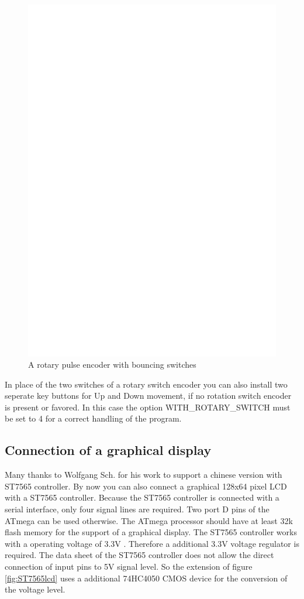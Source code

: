 \begin{figure}[H]
\centering
\includegraphics[width=14cm]{../FIG/rotary_bouncing.eps}
\caption{A rotary pulse encoder with bouncing switches}
\label{fig:RotBounce}
\end{figure}

In place of the two switches of a rotary switch encoder you can also install two seperate
key buttons for Up and Down movement, if no rotation switch encoder is present or favored.
In this case the option WITH\_ROTARY\_SWITCH must be set to 4 for a correct handling of
the program.

\subsection{Connection of a graphical display}

Many thanks to Wolfgang Sch. for his work to support a chinese version with ST7565 controller.
By now you can also connect a graphical 128x64 pixel LCD with a ST7565 controller.
Because the ST7565 controller is connected with a serial interface, only four signal
lines are required. Two port D pins of the ATmega can be used otherwise.
The ATmega processor should have at least 32k flash memory for the support of a graphical display.
The ST7565 controller works with a operating voltage of 3.3V .
Therefore a additional 3.3V voltage regulator is required.
The data sheet of the ST7565 controller does not allow the direct connection of input pins to
5V signal level. So the extension of figure \ref{fig:ST7565lcd} uses a additional 74HC4050 CMOS
device for the conversion of the voltage level.

